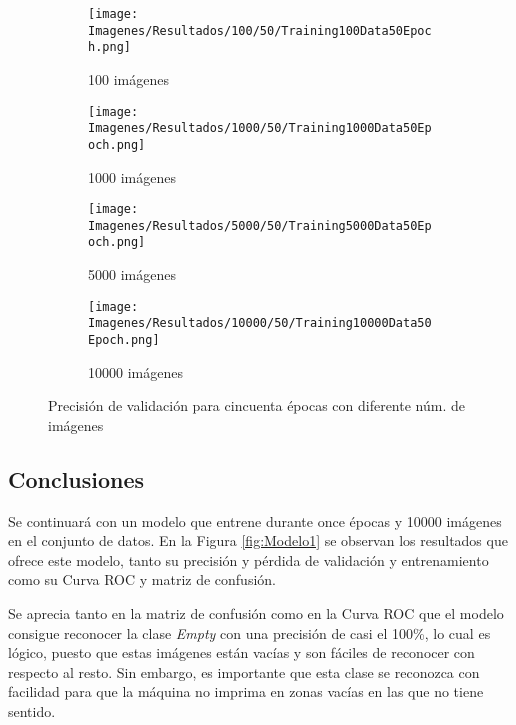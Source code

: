 \documentclass{report}
\begin{document}
\begin{figure}[H]
	 	\centering
	 	\begin{subfigure}[b]{0.45\linewidth}
	 	\centering
	 		\texttt{[image: Imagenes/Resultados/100/50/Training100Data50Epoch.png]}
	 		\caption{ 100 imágenes }
                    \label{fig:50Epo100DTrain}
	 	\end{subfigure}
	 	\begin{subfigure}[b]{0.45\linewidth}
	 	\centering
	 		\texttt{[image: Imagenes/Resultados/1000/50/Training1000Data50Epoch.png]}
	 		\caption{ 1000 imágenes }
                    \label{fig:50Epo1000DTrain}
	 	\end{subfigure}
	 	\centering
	 	\begin{subfigure}[b]{0.45\linewidth}
	 	\centering
	 		\texttt{[image: Imagenes/Resultados/5000/50/Training5000Data50Epoch.png]}
	 		\caption{ 5000 imágenes }
                    \label{fig:50Epo5000DTrain}
	 	\end{subfigure}
	 	\centering
	 	\begin{subfigure}[b]{0.45\linewidth}
	 	\centering
	 		\texttt{[image: Imagenes/Resultados/10000/50/Training10000Data50Epoch.png]}
	 		\caption{ 10000 imágenes }
                    \label{fig:50Epo10000DTrain}
	 	\end{subfigure}
	 	\caption{ Precisión de validación para cincuenta épocas con diferente núm. de imágenes }
	 	\label{fig:50ETrain}
\end{figure}


\newpage
\subsection{Conclusiones}

Se continuará con un modelo que entrene durante once épocas y 10000 imágenes en el conjunto de datos. En la Figura \ref{fig:Modelo1} se observan los resultados que ofrece este modelo, tanto su precisión y pérdida de validación y entrenamiento como su Curva ROC y matriz de confusión.

Se aprecia tanto en la matriz de confusión como en la Curva ROC que el modelo consigue reconocer la clase \textit{Empty} con una precisión de casi el 100\%, lo cual es lógico, puesto que estas imágenes están vacías y son fáciles de reconocer con respecto al resto. Sin embargo, es importante que esta clase se reconozca con facilidad para que la máquina no imprima en zonas vacías en las que no tiene sentido.
\end{document}
